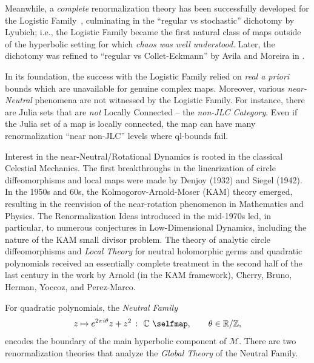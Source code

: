 \documentclass[twoside,leqno]{article}
\theoremstyle{plain}
\newcommand{\C}{{\mathbb{C}}}
\newcommand{\R}{\mathbb{R}}
\newcommand{\Z}{\mathbb{Z}}
\newcommand\MM{{\mathcal{M}}}
\begin{document}


Meanwhile, a \emph{complete} renormalization theory has been successfully developed for the Logistic Family~\cite{McM2,  LyuActa,GS}, culminating in the ``regular vs stochastic'' dichotomy \cite{LyuRegSt} by Lyubich; i.e., the Logistic Family became the first natural class of maps outside of the hyperbolic setting for which \emph{chaos was well understood}. Later, the dichotomy was refined to ``regular vs Collet-Eckmann'' by Avila and Moreira in \cite{AM}.



In its foundation, the success with the Logistic Family relied on \emph{real a priori} bounds which are unavailable for genuine complex maps. Moreover, various \emph{near-Neutral} phenomena are not witnessed by the Logistic Family. For instance, there are Julia sets that are \emph{not} Locally Connected -- the \emph{non-JLC Category}. Even if the Julia set of a map is locally connected, the map can have many renormalization ``near non-JLC'' levels where ql-bounds fail.


Interest in the near-Neutral/Rotational Dynamics is rooted in the classical Celestial Mechanics. The first breakthroughs in the linearization of circle diffeomorphisms and local maps were made by Denjoy (1932) and Siegel (1942). In the 1950s and 60s, the Kolmogorov-Arnold-Moser (KAM) theory emerged, resulting in the reenvision of the near-rotation phenomenon in Mathematics and Physics. The Renormalization Ideas introduced in the mid-1970s led, in particular, to numerous conjectures in Low-Dimensional Dynamics, including the nature of the KAM small divisor problem. The theory of analytic circle diffeomorphisms and \emph{Local Theory} for neutral holomorphic germs and quadratic polynomials received an essentially complete treatment in the
second half of the last century in the work by Arnold (in the KAM framework), Cherry, Bruno,
Herman,  Yoccoz, and Perez-Marco. 






For quadratic polynomials, the \emph{Neutral Family} 
\begin{equation}
\label{eq:neutr famil} z\mapsto e^{2\pi i \theta} z+ z^2\ \colon\ \C\ \selfmap, \qquad \theta\in \R/\Z,
\end{equation} 
encodes the boundary of the main hyperbolic component of $\MM$. There are two renormalization theories that analyze the \emph{Global Theory} of the Neutral Family.
\end{document}
